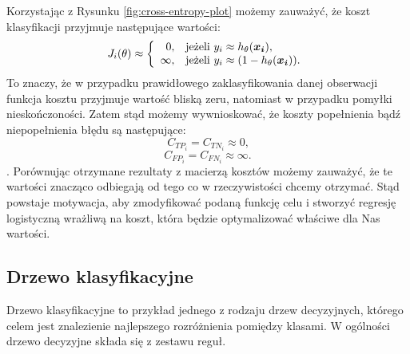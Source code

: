 \documentclass[inzynierska]{pwr_wmat_praca_dyplomowa}
\theoremstyle{plain}
\numberwithin{theorem}{chapter}
\theoremstyle{definition}
\numberwithin{theorem}{chapter}
\begin{document}
Korzystając z Rysunku \ref{fig:cross-entropy-plot} możemy zauważyć, że koszt klasyfikacji przyjmuje następujące wartości:
$$
J_i(\theta) \approx \left\{
\begin{array}{rl}
0, &\mbox{jeżeli $y_i \approx h_{\theta}(\boldsymbol{x_i})$}, \\
\infty, &\mbox{jeżeli $y_i \approx (1 - h_{\theta}(\boldsymbol{x_i}))$}.
\end{array}{}
\right.
$$
To znaczy, że w przypadku prawidłowego zaklasyfikowania danej obserwacji funkcja kosztu przyjmuje wartość bliską zeru, natomiast w przypadku pomyłki nieskończoności. Zatem stąd możemy wywnioskować, że koszty popełnienia bądź niepopełnienia błędu są następujące:
$$ C_{TP_i} = C_{TN_i} \approx 0 \text{,}$$
$$ C_{FP_i} = C_{FN_i} \approx \infty \text{.}$$.
Porównując otrzymane rezultaty z macierzą kosztów możemy zauważyć, że te wartości znacząco odbiegają od tego co w rzeczywistości chcemy otrzymać. Stąd powstaje motywacja, aby zmodyfikować podaną funkcję celu i stworzyć regresję logistyczną wrażliwą na koszt, która będzie optymalizować właściwe dla Nas wartości.

\subsection{Drzewo klasyfikacyjne}
\label{drzewo}

Drzewo klasyfikacyjne to przykład jednego z rodzaju drzew decyzyjnych, którego celem jest znalezienie najlepszego rozróżnienia pomiędzy klasami. W ogólności drzewo decyzyjne składa się z zestawu reguł.
\end{document}
